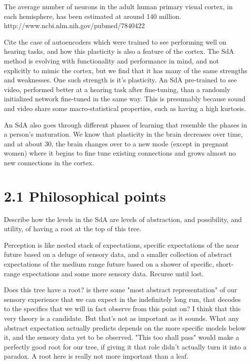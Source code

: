 \documentclass[11pt]{article}
\begin{document}
The average number of neurons in the adult human primary visual cortex, in each hemisphere, has been estimated at around 140 million. http://www.ncbi.nlm.nih.gov/pubmed/7840422

Cite the case of autoencoders which were trained to see performing well on hearing tasks, and how this plasticity is also a feature of the cortex.
The SdA method is evolving with functionality and performance in mind, and not explicitly to mimic the cortex, but we find that it has many of the same strengths and weaknesses. One such strength is it's plasticity. An SdA pre-trained to see video, performed better at a hearing task after fine-tuning, than a randomly initialized network fine-tuned in the same way. This is presumably because sound and video share some macro-statistical properties, such as having a high kurtosis.

An SdA also goes through different phases of learning that resemble the phases in a person's maturation. We know that plasticity in the brain decreases over time, and at about 30, the brain changes over to a new mode (except in pregnant women) where it begins to fine tune existing connections and grows almost no new connections in the cortex.

\section{2.1 Philosophical points}
\label{Philosophical points}

Describe how the levels in the SdA are levels of abstraction, and possibility, and utility, of having a root at the top of this tree.

Perception is like nested stack of expectations, specific expectations of the near future based on a deluge of sensory data, and a smaller collection of abstract expectations of the medium range future based on a shower of specific, short-range expectations and some more sensory data. Recurse until lost.

Does this tree have a root? is there some "most abstract representation" of our sensory experience that we can expect in the indefinitely long run, that decodes to the specifics that we will in fact observe from this point on? I think that this very theory is a candidate. But that's not as important as it sounds. What any abstract expectation actually predicts depends on the more specific models below it, and the sensory data yet to be observed.  "This too shall pass" would make a perfectly good root for our tree, if giving it that role didn't actually turn it into a paradox. A root here is really not more important than a leaf.
\end{document}
